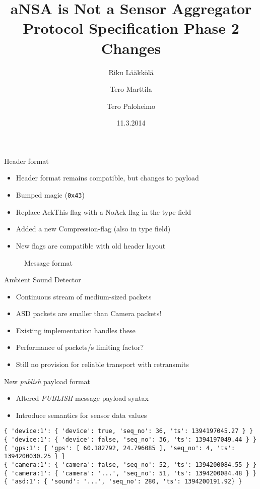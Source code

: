 \documentclass{beamer}
\title[SFO protocol]{aNSA is Not a Sensor Aggregator\\Protocol Specification Phase 2 Changes}
\author{Riku Lääkkölä \and Tero Marttila \and Tero Paloheimo}
\institute{Aalto ELEC}
\date{11.3.2014}
\begin{document}
\begin{frame}
\titlepage
\end{frame}

\begin{frame}{Header format}
\begin{itemize}
	\item Header format remains compatible, but changes to payload
	\item Bumped magic (\texttt{0x43})
	\item Replace AckThis-flag with a NoAck-flag in the type field
	\item Added a new Compression-flag (also in type field)
	\item New flags are compatible with old header layout
\end{itemize}

\begin{figure}
    \begin{center}
        {\tiny }
        \caption{Message format}
        \label{fig:header}
    \end{center}
\end{figure}

\end{frame}

\begin{frame}{Ambient Sound Detector}
\begin{itemize}
	\item Continuous stream of medium-sized packets
	\item ASD packets are smaller than Camera packets!
	\item Existing implementation handles these
	\item Performance of packets/s limiting factor?
	\item Still no provision for reliable transport with retransmits
\end{itemize}
\end{frame}

\begin{frame}[fragile]{New \emph{publish} payload format}
\begin{itemize}
	\item Altered \emph{PUBLISH} message payload syntax
	\item Introduce semantics for sensor data values
\end{itemize}
\footnotesize
\begin{verbatim}
{ 'device:1': { 'device': true, 'seq_no': 36, 'ts': 1394197045.27 } }
{ 'device:1': { 'device': false, 'seq_no': 36, 'ts': 1394197049.44 } }
{ 'gps:1': { 'gps': [ 60.182792, 24.796085 ], 'seq_no': 4, 'ts': 1394200030.25 } }
{ 'camera:1': { 'camera': false, 'seq_no': 52, 'ts': 1394200084.55 } }
{ 'camera:1': { 'camera': '...', 'seq_no': 51, 'ts': 1394200084.48 } }
{ 'asd:1': { 'sound': '...', 'seq_no': 280, 'ts': 1394200191.92} }
\end{verbatim}
\end{frame}
\end{document}
